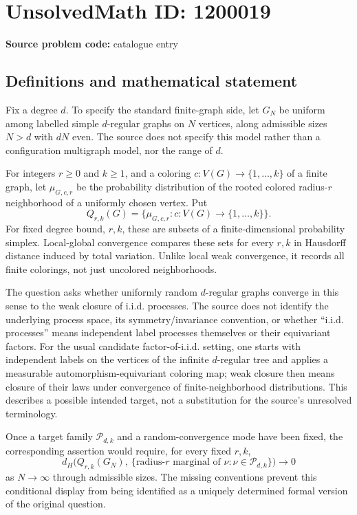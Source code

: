 \documentclass[11pt]{article}
\begin{document}
\section*{UnsolvedMath ID: 1200019}
\textbf{Source problem code:} catalogue entry
\subsection{Definitions and mathematical statement}
Fix a degree $d$. To specify the standard finite-graph side, let $G_N$ be uniform among labelled simple $d$-regular graphs on $N$ vertices, along admissible sizes $N>d$ with $dN$ even. The source does not specify this model rather than a configuration multigraph model, nor the range of $d$.

For integers $r\geq0$ and $k\geq1$, and a coloring $c:V(G)\to\{1,\ldots,k\}$ of a finite graph, let $\mu_{G,c,r}$ be the probability distribution of the rooted colored radius-$r$ neighborhood of a uniformly chosen vertex. Put
\[
 Q_{r,k}(G)=\{\mu_{G,c,r}:c:V(G)\to\{1,\ldots,k\}\}.
\]
For fixed degree bound, $r,k$, these are subsets of a finite-dimensional probability simplex. Local-global convergence compares these sets for every $r,k$ in Hausdorff distance induced by total variation. Unlike local weak convergence, it records all finite colorings, not just uncolored neighborhoods.

The question asks whether uniformly random $d$-regular graphs converge in this sense to the weak closure of i.i.d. processes. The source does not identify the underlying process space, its symmetry/invariance convention, or whether ``i.i.d. processes'' means independent label processes themselves or their equivariant factors. For the usual candidate factor-of-i.i.d. setting, one starts with independent labels on the vertices of the infinite $d$-regular tree and applies a measurable automorphism-equivariant coloring map; weak closure then means closure of their laws under convergence of finite-neighborhood distributions. This describes a possible intended target, not a substitution for the source's unresolved terminology.

Once a target family $\mathcal P_{d,k}$ and a random-convergence mode have been fixed, the corresponding assertion would require, for every fixed $r,k$,
\[
 d_H\bigl(Q_{r,k}(G_N),\ \{\text{radius-}r\text{ marginal of }\nu:
                     \nu\in\mathcal P_{d,k}\}\bigr)\longrightarrow0
\]
as $N\to\infty$ through admissible sizes. The missing conventions prevent this conditional display from being identified as a uniquely determined formal version of the original question.
\end{document}
